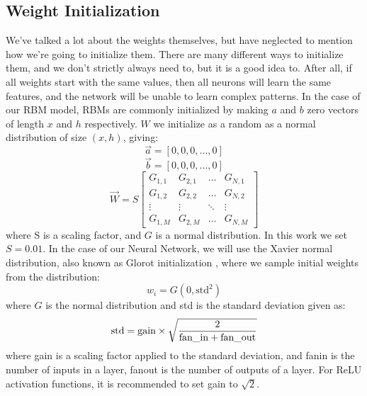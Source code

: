\documentclass[12pt]{article}
\begin{document}
{\subsection{Weight Initialization}
We've talked a lot about the weights themselves, but have neglected to mention how we're going to initialize them. There are many different ways to initialize them, and we don't strictly always need to, but it is a good idea to. After all, if all weights start with the same values, then all neurons will learn the same features, and the network will be unable to learn complex patterns. \newline
In the case of our RBM model, RBMs are commonly initialized by making $a$ and $b$ zero vectors of length $x$ and $h$ respectively. $W$ we initialize as a random as a normal distribution of size $(x, h)$, giving:
\begin{equation*}
    \Vec{a} = [0, 0, 0, ..., 0]
\end{equation*}
\begin{equation*}
    \Vec{b} = [0, 0, 0, ..., 0]
\end{equation*}
\begin{equation*}
    \Vec{W} = S \left[\begin{matrix}
        G_{1,1}& G_{2, 1}& \dots& G_{N,1}  \\
        G_{1,2}&  G_{2,2}& \dots& G_{N,2} \\
        \vdots& \vdots& \ddots& \vdots \\
        G_{1,M}& G_{2, M}& \dots& G_{N, M}
    \end{matrix}\right]
\end{equation*}
where S is a scaling factor, and $G$ is a normal distribution. In this work we set $S=0.01$. \newline
In the case of our Neural Network, we will use the Xavier normal distribution, also known as Glorot initialization \cite{glorot}, where we sample initial weights from the distribution:
\begin{equation*}
    w_i = G(0, \text{std}^2)
\end{equation*}
where $G$ is the normal distribution and std is the standard deviation given as:
\begin{equation*}
    \text{std} = \text{gain} \times \sqrt{\frac{2}{\text{fan\textunderscore in} + \text{fan\textunderscore out}}}
\end{equation*}
where gain is a scaling factor applied to the standard deviation, and fan\textunderscore in is the number of inputs in a layer, fan\textunderscore out is the number of outputs of a layer. For ReLU activation functions, it is recommended to set gain to $\sqrt{2}$.
\newpage
}
\end{document}

